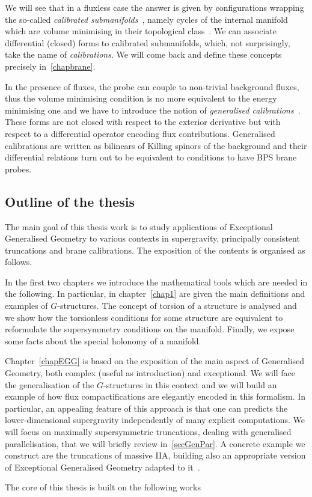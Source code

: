 \documentclass[draft]{phd}
\begin{document}
			We will see that in a fluxless case the answer is given by configurations wrapping the so-called \emph{calibrated submanifolds}~\cite{calibration1, calibration2, calibration3, calibration4}, namely cycles of the internal manifold which are volume minimising in their topological class~\cite{CalGeo, JoyceLectLagr}.
			We can associate differential (closed) forms to calibrated submanifolds, which, not surprisingly, take the name of \emph{calibrations}.
			We will come back and define these concepts precisely in~\ref{chapbrane}.
			
			In the presence of fluxes, the probe can couple to non-trivial background fluxes, thus the volume minimising condition is no more equivalent to the energy minimising one and we have to introduce the notion of \emph{generalised calibrations}~\cite{gencalibration1, gencalibration2, gencalibration3, gencalibration4}.
			These forms are not closed with respect to the exterior derivative but with respect to a differential operator encoding flux contributions.
			Generalised calibrations are written as bilinears of Killing spinors of the background and their differential relations turn out to be equivalent to conditions to have BPS brane probes.
	\subsection*{Outline of the thesis}
			The main goal of this thesis work is to study applications of Exceptional Generalised Geometry to various contexts in supergravity, principally consistent truncations and brane calibrations.
			The exposition of the contents is organised as follows.
			
			In the first two chapters we introduce the mathematical tools which are needed in the following.
			In particular, in chapter~\ref{chap1} are given the main definitions and examples of $G$-structures. The concept of torsion of a structure is analysed and we show how the torsionless conditions for some structure are equivalent to reformulate the supersymmetry conditions on the manifold.
			Finally, we expose some facts about the special holonomy of a manifold.
			
			Chapter~\ref{chapEGG} is based on the exposition of the main aspect of Generalised Geometry, both complex (useful as introduction) and exceptional.
			We will face the generalisation of the $G$-structures in this context and we will build an example of how flux compactifications are elegantly encoded in this formalism.
			In particular, an appealing feature of this approach is that one can predicts the lower-dimensional supergravity independently of many explicit computations.
			We will focus on maximally supersymmetric truncations, dealing with generalised parallelisation, that we will briefly review in~\ref{secGenPar}.
			A concrete example we construct are the truncations of massive IIA, building also an appropriate version of Exceptional Generalised Geometry adapted to it~\cite{oscar1}.
			
			The core of this thesis is built on the following works
			
\end{document}
